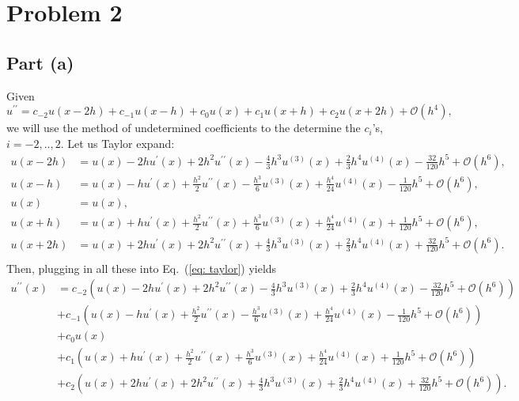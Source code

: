 \documentclass[aps,prl,preprint,groupedaddress]{revtex4-1}
\begin{document}
\section{Problem 2}
\subsection{Part (a)}
Given
\begin{equation}\label{eq: taylor}
u^{\prime\prime} = c_{-2}u(x-2h)+c_{-1}u(x-h)+c_{0}u(x)+c_{1}u(x+h)+c_{2}u(x+2h)+\mathcal{O}(h^{4}),
\end{equation}
we will use the method of undetermined coefficients to the determine the $c_{i}$'s, $i=-2,..,2$. Let us Taylor expand:
\begin{align*}
u(x-2h) &= u(x)-2hu^{\prime}(x)+2h^2u^{\prime\prime}(x)-\frac{4}{3}h^{3}u^{(3)}(x)+\frac{2}{3}h^{4}u^{(4)}(x)-\frac{32}{120}h^{5}+\mathcal{O}(h^{6}),\\
u(x-h) &= u(x)-hu^{\prime}(x)+\frac{h^2}{2}u^{\prime\prime}(x)-\frac{h^{3}}{6}u^{(3)}(x)+\frac{h^{4}}{24}u^{(4)}(x)-\frac{1}{120}h^{5}+\mathcal{O}(h^{6}),\\
u(x) &= u(x),\\
u(x+h) &= u(x)+hu^{\prime}(x)+\frac{h^2}{2}u^{\prime\prime}(x)+\frac{h^{3}}{6}u^{(3)}(x)+\frac{h^{4}}{24}u^{(4)}(x)+\frac{1}{120}h^{5}+\mathcal{O}(h^{6}),\\
u(x+2h) &= u(x)+2hu^{\prime}(x)+2h^2u^{\prime\prime}(x)+\frac{4}{3}h^{3}u^{(3)}(x)+\frac{2}{3}h^{4}u^{(4)}(x)+\frac{32}{120}h^{5}+\mathcal{O}(h^{6}).\\
\end{align*}
Then, plugging in all these into Eq.~(\ref{eq: taylor}) yields
\begin{align}\label{eq: coeff}
u^{\prime\prime}(x) &= c_{-2}(u(x)-2hu^{\prime}(x)+2h^2u^{\prime\prime}(x)-\frac{4}{3}h^{3}u^{(3)}(x)+\frac{2}{3}h^{4}u^{(4)}(x)-\frac{32}{120}h^{5}+\mathcal{O}(h^{6}))\nonumber\\ &+ c_{-1}(u(x)-hu^{\prime}(x)+\frac{h^2}{2}u^{\prime\prime}(x)-\frac{h^{3}}{6}u^{(3)}(x)+\frac{h^{4}}{24}u^{(4)}(x)-\frac{1}{120}h^{5}+\mathcal{O}(h^{6}))\nonumber\\ &+ c_{0}u(x)\nonumber\\ &+ c_{1}(u(x)+hu^{\prime}(x)+\frac{h^2}{2}u^{\prime\prime}(x)+\frac{h^{3}}{6}u^{(3)}(x)+\frac{h^{4}}{24}u^{(4)}(x)+\frac{1}{120}h^{5}+\mathcal{O}(h^{6}))\nonumber\\ &+ c_{2}(u(x)+2hu^{\prime}(x)+2h^2u^{\prime\prime}(x)+\frac{4}{3}h^{3}u^{(3)}(x)+\frac{2}{3}h^{4}u^{(4)}(x)+\frac{32}{120}h^{5}+\mathcal{O}(h^{6})).
\end{align}
\end{document}
